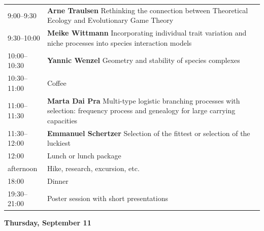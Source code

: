 \documentclass[12pt,a4paper]{article}
\begin{document}
\begin{tabular}{@{}l p{}@{}}
9:00--9:30 &\textbf{Arne Traulsen } Rethinking the connection between Theoretical Ecology and Evolutionary Game Theory \\
9:30--10:00 &\textbf{Meike Wittmann } Incorporating individual trait variation and niche processes into species interaction models \\
10:00--10:30 &\textbf{Yannic Wenzel } Geometry and stability of species complexes \\
10:30--11:00 & Coffee \\
11:00--11:30 &\textbf{Marta Dai Pra } Multi-type logistic branching processes with selection: frequency process and genealogy for large carrying capacities \\
11:30--12:00 &\textbf{Emmanuel Schertzer } Selection of the fittest or selection of the luckiest \\
12:00 & Lunch or lunch package \\
afternoon & Hike, research, excursion, etc. \\
18:00 & Dinner \\
19:30--21:00 & Poster session with short presentations \\
\end{tabular}

\newpage
\textbf{\Large Thursday, September 11}\medskip
\end{document}
